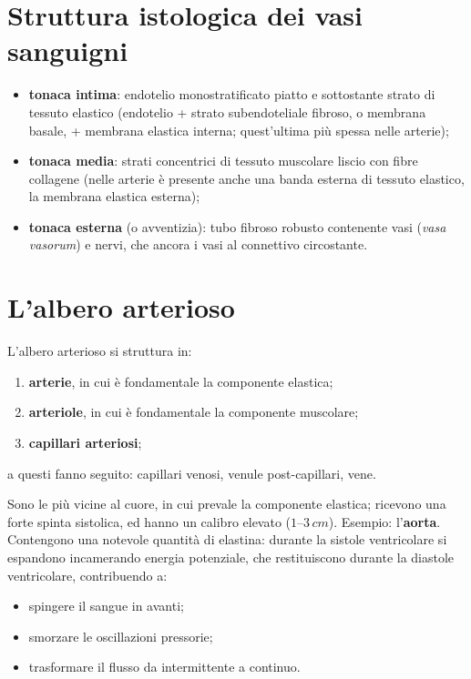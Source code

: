 \section{Struttura istologica dei vasi sanguigni}

\begin{itemize}
  \item \textbf{tonaca intima}: endotelio monostratificato piatto e sottostante strato di tessuto
    elastico (endotelio + strato subendoteliale fibroso, o membrana basale, + membrana elastica
    interna; quest'ultima più spessa nelle arterie);
  \item \textbf{tonaca media}: strati concentrici di tessuto muscolare liscio con fibre collagene
    (nelle arterie è presente anche una banda esterna di tessuto elastico, la membrana elastica
    esterna);
  \item \textbf{tonaca esterna} (o avventizia): tubo fibroso robusto contenente vasi (\textit{vasa
    vasorum}) e nervi, che ancora i vasi al connettivo circostante.
\end{itemize}

\section{L'albero arterioso}

L'albero arterioso si struttura in:
\begin{enumerate}
  \item \textbf{arterie}, in cui è fondamentale la componente elastica;
  \item \textbf{arteriole}, in cui è fondamentale la componente muscolare;
  \item \textbf{capillari arteriosi};
\end{enumerate}
a questi fanno seguito: capillari venosi, venule post-capillari, vene.

Sono le più vicine al cuore, in cui prevale la componente elastica; ricevono una forte spinta
sistolica, ed hanno un calibro elevato ($1$--$3\,cm$). Esempio: l'\textbf{aorta}. Contengono una
notevole quantità di elastina: durante la sistole ventricolare si espandono incamerando energia
potenziale, che restituiscono durante la diastole ventricolare, contribuendo a:
\begin{itemize}
  \item spingere il sangue in avanti;
  \item smorzare le oscillazioni pressorie;
  \item trasformare il flusso da intermittente a continuo.
\end{itemize}

